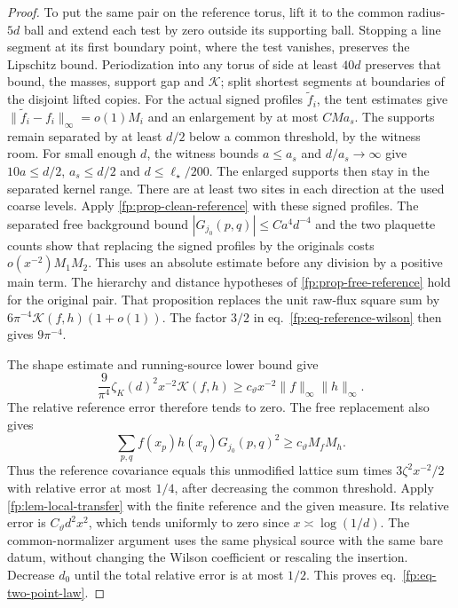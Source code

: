 \documentclass[11pt,letterpaper,reqno]{amsart}
\numberwithin{equation}{section}
\renewcommand{\eqref}[1]{\textup{eq.~\ref{#1}}}
\theoremstyle{definition}
\theoremstyle{remark}
\begin{document}
\begin{proof}
To put the same pair on the reference torus, lift it to the
common radius-\(5d\) ball and extend each test by zero outside
its supporting ball. Stopping a line segment at its first
boundary point, where the test vanishes, preserves the
Lipschitz bound. Periodization into any torus of side at least
\(40d\) preserves that bound, the masses, support gap and
\(\mathcal K\); split shortest segments at boundaries of
the disjoint lifted copies.
For the actual signed profiles $\widetilde f_i$, the tent estimates give
$\|\widetilde f_i-f_i\|_\infty=o(1)M_i$ and an enlargement
by at most $CMa_s$. The supports remain separated by at
least $d/2$ below a common threshold, by the witness room.
For small enough \(d\), the witness bounds \(a\le a_s\) and
\(d/a_s\to\infty\) give \(10a\le d/2\), \(a_s\le d/2\) and
\(d\le\ell_\star/200\). The enlarged supports then stay in
the separated kernel range. There are at least two sites in
each direction at the used coarse levels.
Apply \cref{fp:prop-clean-reference} with these signed profiles.
The separated free background bound
$|G_{j_0}(p,q)|\le C a^4d^{-4}$ and the two plaquette
counts show that replacing the signed profiles by the
originals costs $o(x^{-2})M_1M_2$. This uses an absolute
estimate before any division by a positive main term.
The hierarchy and distance hypotheses of
\cref{fp:prop-free-reference} hold for the original pair.
That proposition replaces the unit raw-flux square sum by
$6\pi^{-4}\mathcal K(f,h)(1+o(1))$.
The factor $3/2$ in \eqref{fp:eq-reference-wilson} then
gives $9\pi^{-4}$.

The shape estimate and running-source lower bound give
\[
 \frac9{\pi^4}\zeta_K(d)^2 x^{-2}\mathcal K(f,h)
      \ge c_\vartheta x^{-2}\|f\|_\infty\|h\|_\infty.
\]
The relative reference error therefore tends to zero.
The free replacement also gives
\[
 \sum_{p,q}f(x_p)h(x_q)G_{j_0}(p,q)^2\ge
                         c_\vartheta M_fM_h .
\]
Thus the reference covariance equals this unmodified lattice sum times
\(3\zeta^2x^{-2}/2\) with relative error at most \(1/4\),
after decreasing the common threshold.
Apply \cref{fp:lem-local-transfer} with the finite reference
and the given measure. Its relative error is
$C_\vartheta d^2x^2$, which tends uniformly to zero since
$x\asymp\log(1/d)$. The common-normalizer argument uses
the same physical source with the same bare datum, without
changing the Wilson coefficient or rescaling the insertion.
Decrease $d_0$ until the total relative error is at most
$1/2$. This proves \eqref{fp:eq-two-point-law}.
\end{proof}
\end{document}
